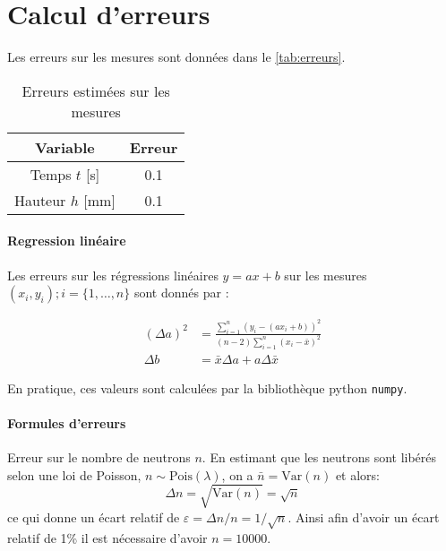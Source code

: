 \section{Calcul d'erreurs}
\label{sec:erreurs}

Les erreurs sur les mesures sont données dans le \autoref{tab:erreurs}.

\begin{table}[h]
    \centering
    \begin{tabulary}{\textwidth}{C C}
        \toprule
        Variable & Erreur \\
        \midrule
        Temps \(t\) [s] & 0.1 \\
        Hauteur \(h\) [mm] & 0.1 \\
        \bottomrule
    \end{tabulary}
    \caption{Erreurs estimées sur les mesures}
    \label{tab:erreurs}
\end{table}

\paragraph*{Regression linéaire}
Les erreurs sur les régressions linéaires \(y = ax + b\) sur les mesures \((x_i, y_i) ; i = \{1, \dots, n\}\) sont donnés par \cite{erreursmesure}:

\begin{equation}
    \label{eq:erreur:fit}
    \begin{aligned}
        (\Delta a)^2 &= \frac{\sum_{i=1}^{n}(y_i - (a x_i + b))^2}{(n-2) \sum_{i=1}^{n}(x_i - \bar{x})^2}\\
        \Delta b &= \bar{x} \Delta a + a \Delta \bar{x}
    \end{aligned}
\end{equation}

En pratique, ces valeurs sont calculées par la bibliothèque python \texttt{numpy}.

\paragraph*{Formules d'erreurs}

Erreur sur le nombre de neutrons \(n\). En estimant que les neutrons sont libérés selon une loi de Poisson, \(n \sim \textrm{Pois}(\lambda)\), on a \(\bar n = \textrm{Var}(n)\) et alors:
\begin{equation}
    \Delta n = {\sqrt{\textrm{Var}(n)}} = \sqrt{n}
\end{equation}
ce qui donne un écart relatif de $\varepsilon = \Delta n/n = 1/\sqrt{n}$. Ainsi afin d'avoir un écart relatif de 1\% il est nécessaire d'avoir $n=10 000$.

